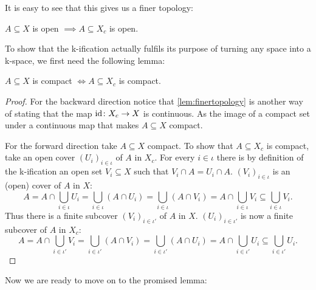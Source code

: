It is easy to see that this gives us a finer topology: 

\begin{lem}\label{lem:finertopology}
    $A \subseteq X$ is open $\implies A \subseteq X_c$ is open.
\end{lem}

To show that the k-ification actually fulfils its purpose of turning any space into a k-space, we first need the following lemma:

\begin{lem}\label{lem:compactiffcompact}
    $A \subseteq X$ is compact $\iff A \subseteq X_c$ is compact.
\end{lem}
\begin{proof}
    For the backward direction notice that \ref{lem:finertopology} is another way of stating that the map $\text{id} \colon X_c \to X$ is continuous. 
    As the image of a compact set under a continuous map that makes $A \subseteq X$ compact. 

    For the forward direction take $A \subseteq X$ compact. 
    To show that $A \subseteq X_c$ is compact, take an open cover $(U_i)_{i \in \iota}$ of $A$ in $X_c$. 
    For every $i \in \iota$ there is by definition of the k-ification an open set $V_i \subseteq X$ such that $V_i \cap A = U_i \cap A$.  
    $(V_i)_{i \in \iota}$ is an (open) cover of $A$ in $X$: 
    \[A = A \cap \bigcup_{i \in \iota} U_i = \bigcup_{i \in \iota} (A \cap U_i) = \bigcup_{i \in \iota} (A \cap V_i) = A \cap \bigcup_{i \in \iota} V_i \subseteq \bigcup_{i \in \iota} V_i.\]
    Thus there is a finite subcover $(V_i)_{i \in \iota'}$ of $A$ in $X$.
    $(U_i)_{i \in \iota'}$ is now a finite subcover of $A$ in $X_c$: 
    \[A = A \cap \bigcup_{i \in \iota'} V_i = \bigcup_{i \in \iota'} (A \cap V_i) = \bigcup_{i \in \iota'} (A \cap U_i) = A \cap \bigcup_{i \in \iota'} U_i \subseteq \bigcup_{i \in \iota'} U_i.\]
\end{proof}

Now we are ready to move on to the promised lemma:

